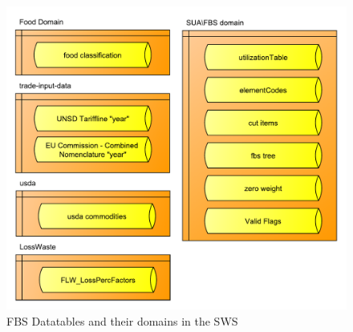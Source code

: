 \documentclass[]{article}
\begin{document}
\begin{figure}[H]

{\centering \includegraphics[width=0.9\linewidth]{images/SwsFbs/04_DataTablesDomains} 

}

\caption{\label{fig:f4}FBS Datatables and their domains in the SWS}\label{fig:f4}
\end{figure}
\end{document}
